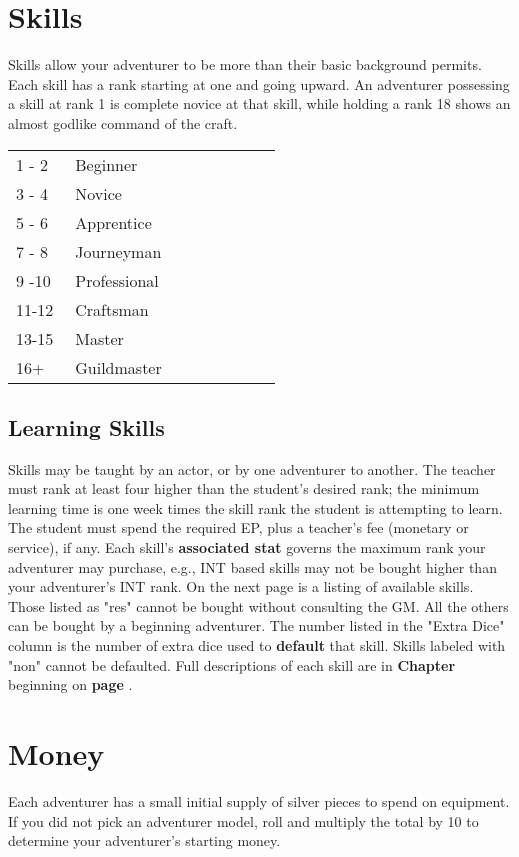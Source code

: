 \begin{multicols*}{2}
\section{Skills}
\label{create-skills}
Skills allow your adventurer to be more than their basic background permits. Each skill has a rank starting at one and going upward. An adventurer possessing a skill at rank 1 is complete novice at that skill, while holding a rank 18 shows an almost godlike command of the craft.
\begin{tcolorbox}[breakable,boxrule=0pt,title=\textbf{Skill Rank Definitions}]
\begin{tabular}{p{0.2\linewidth} p{0.7\linewidth}}
1 - 2 & Beginner\\
3 - 4 & Novice\\
5 - 6 & Apprentice\\
7 - 8 & Journeyman\\
9 -10 & Professional\\
11-12 & Craftsman\\
13-15 & Master\\
16+ & Guildmaster\\
\end{tabular}
\end{tcolorbox}
\subsection{Learning Skills}
Skills may be taught by an actor, or by one adventurer to another. The teacher must rank at least four higher than the student's desired rank; the minimum learning time is one week times the skill rank the student is attempting to learn. The student must spend the required EP, plus a teacher's fee (monetary or service), if any.
Each skill's \textbf{associated stat} governs the maximum rank your adventurer may purchase, e.g., INT based skills may not be bought higher than your adventurer's INT rank.
On the next page is a listing of available skills. Those listed as "res" cannot be bought without consulting the GM. All the others can be bought by a beginning adventurer. The number listed in the "Extra Dice" column is the number of extra dice used to \textbf{default} that skill. Skills labeled with "non" cannot be defaulted. Full descriptions of each skill are in \textbf{Chapter } beginning on \textbf{page \pageref{ch:skills}}.
\null \vfill

\columnbreak
\section{Money}
Each adventurer has a small initial supply of silver pieces to spend on equipment. If you did not pick an adventurer model, roll  and multiply the total by 10 to determine your adventurer's starting money.

\end{multicols*}
